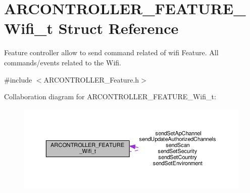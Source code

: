 \hypertarget{struct_a_r_c_o_n_t_r_o_l_l_e_r___f_e_a_t_u_r_e___wifi__t}{}\section{A\+R\+C\+O\+N\+T\+R\+O\+L\+L\+E\+R\+\_\+\+F\+E\+A\+T\+U\+R\+E\+\_\+\+Wifi\+\_\+t Struct Reference}
\label{struct_a_r_c_o_n_t_r_o_l_l_e_r___f_e_a_t_u_r_e___wifi__t}


Feature controller allow to send command related of wifi Feature. All commands/events related to the Wifi.  




{\ttfamily \#include $<$A\+R\+C\+O\+N\+T\+R\+O\+L\+L\+E\+R\+\_\+\+Feature.\+h$>$}



Collaboration diagram for A\+R\+C\+O\+N\+T\+R\+O\+L\+L\+E\+R\+\_\+\+F\+E\+A\+T\+U\+R\+E\+\_\+\+Wifi\+\_\+t\+:
\nopagebreak
\begin{figure}[H]
\begin{center}
\leavevmode
\includegraphics[width=350pt]{struct_a_r_c_o_n_t_r_o_l_l_e_r___f_e_a_t_u_r_e___wifi__t__coll__graph}
\end{center}
\end{figure}
